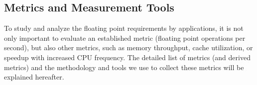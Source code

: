%
%
%
%
%
%
%
%


\subsection{Metrics and Measurement Tools}\label{ssec:metrics}
%
%
%
To study and analyze the floating point requirements by applications, it is not only important to
evaluate an established metric (floating point operations per second), but also other metrics,
such as memory throughput, cache utilization, or speedup with increased CPU frequency.
%
The detailed list of metrics (and derived metrics) and the methodology and tools we use to
collect these metrics will be explained hereafter.

